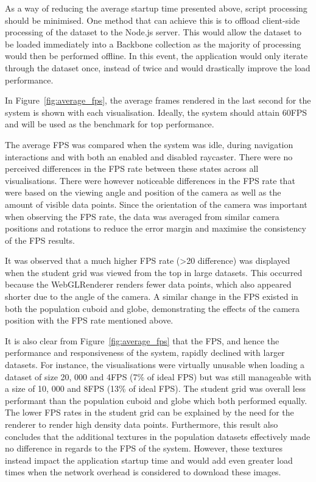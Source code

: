{{		

		As a way of reducing the average startup time presented above, script processing should be minimised. One method that can achieve this is to offload client-side processing of the dataset to the Node.js server. This would allow the dataset to be loaded immediately into a Backbone collection as the majority of processing would then be performed offline. In this event, the application would only iterate through the dataset once, instead of twice and would drastically improve the load performance. 


		In Figure~\ref{fig:average_fps}, the average frames rendered in the last second for the system is shown with each visualisation. Ideally, the system should attain 60FPS and will be used as the benchmark for top performance.

		

		The average FPS was compared when the system was idle, during navigation interactions and with both an enabled and disabled raycaster. There were no perceived differences in the FPS rate between these states across all visualisations. There were however noticeable differences in the FPS rate that were based on the viewing angle and position of the camera as well as the amount of visible data points. Since the orientation of the camera was important when observing the FPS rate, the data was averaged from similar camera positions and rotations to reduce the error margin and maximise the consistency of the FPS results. 

		It was observed that a much higher FPS rate (\textgreater20 difference) was displayed when the student grid was viewed from the top in large datasets. This occurred because the WebGLRenderer renders fewer data points, which also appeared shorter due to the angle of the camera. A similar change in the FPS existed in both the population cuboid and globe, demonstrating the effects of the camera position with the FPS rate mentioned above. 

		It is also clear from Figure~\ref{fig:average_fps} that the FPS, and hence the performance and responsiveness of the system, rapidly declined with larger datasets. For instance, the visualisations were virtually unusable when loading a dataset of size 20, 000 and 4FPS (7\% of ideal FPS) but was still manageable with a size of 10, 000 and 8FPS (13\% of ideal FPS). The student grid was overall less performant than the population cuboid and globe which both performed equally. The lower FPS rates in the student grid can be explained by the need for the renderer to render high density data points. Furthermore, this result also concludes that the additional textures in the population datasets effectively made no difference in regards to the FPS of the system. However, these textures instead impact the application startup time and would add even greater load times when the network overhead is considered to download these images.

}}

